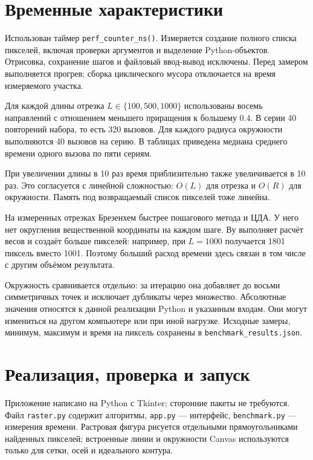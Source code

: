 \documentclass[12pt,a4paper]{extarticle}
\newcommand{\code}[1]{\texttt{\small #1}}
\begin{document}
\clearpage
\section{Временные характеристики}


Использован таймер \code{perf\_counter\_ns()}. Измеряется создание полного списка пикселей, включая проверки аргументов и выделение Python-объектов. Отрисовка, сохранение шагов и файловый ввод-вывод исключены. Перед замером выполняется прогрев; сборка циклического мусора отключается на время измеряемого участка.

Для каждой длины отрезка $L\in\{100,500,1000\}$ использованы восемь направлений с отношением меньшего приращения к большему $0.4$. В серии 40 повторений набора, то есть 320 вызовов. Для каждого радиуса окружности выполняются 40 вызовов на серию. В таблицах приведена медиана среднего времени одного вызова по пяти сериям.

\begin{table}[H]
\centering\small
\caption{Время растеризации отрезка, мкс на вызов}

\end{table}
\begin{table}[H]
\centering\small
\caption{Время растеризации окружности}

\end{table}
При увеличении длины в 10 раз время приблизительно также увеличивается в 10 раз. Это согласуется с линейной сложностью: $O(L)$ для отрезка и $O(R)$ для окружности. Память под возвращаемый список пикселей тоже линейна.

На измеренных отрезках Брезенхем быстрее пошагового метода и ЦДА. У него нет округления вещественной координаты на каждом шаге. Ву выполняет расчёт весов и создаёт больше пикселей: например, при $L=1000$ получается 1801 пиксель вместо 1001. Поэтому больший расход времени здесь связан в том числе с другим объёмом результата.

Окружность сравнивается отдельно: за итерацию она добавляет до восьми симметричных точек и исключает дубликаты через множество. Абсолютные значения относятся к данной реализации Python и указанным входам. Они могут измениться на другом компьютере или при иной нагрузке. Исходные замеры, минимум, максимум и время на пиксель сохранены в \code{benchmark\_results.json}.

\clearpage
\section{Реализация, проверка и запуск}
Приложение написано на Python с Tkinter; сторонние пакеты не требуются. Файл \code{raster.py} содержит алгоритмы, \code{app.py} --- интерфейс, \code{benchmark.py} --- измерения времени. Растровая фигура рисуется отдельными прямоугольниками найденных пикселей; встроенные линии и окружности Canvas используются только для сетки, осей и идеального контура.
\end{document}
